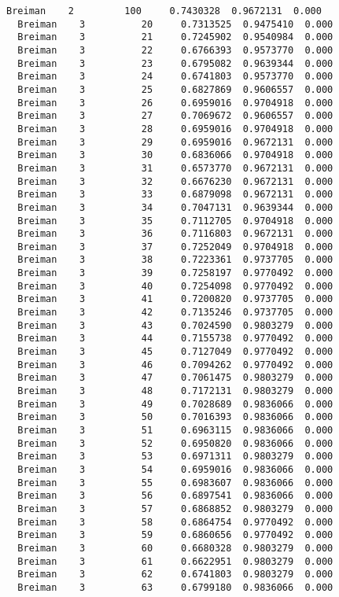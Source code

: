 \documentclass[11pt]{article}
\begin{document}
\begin{Verbatim}[commandchars=\\\{\}]
  Breiman    2         100     0.7430328  0.9672131  0.000
  Breiman    3          20     0.7313525  0.9475410  0.000
  Breiman    3          21     0.7245902  0.9540984  0.000
  Breiman    3          22     0.6766393  0.9573770  0.000
  Breiman    3          23     0.6795082  0.9639344  0.000
  Breiman    3          24     0.6741803  0.9573770  0.000
  Breiman    3          25     0.6827869  0.9606557  0.000
  Breiman    3          26     0.6959016  0.9704918  0.000
  Breiman    3          27     0.7069672  0.9606557  0.000
  Breiman    3          28     0.6959016  0.9704918  0.000
  Breiman    3          29     0.6959016  0.9672131  0.000
  Breiman    3          30     0.6836066  0.9704918  0.000
  Breiman    3          31     0.6573770  0.9672131  0.000
  Breiman    3          32     0.6676230  0.9672131  0.000
  Breiman    3          33     0.6879098  0.9672131  0.000
  Breiman    3          34     0.7047131  0.9639344  0.000
  Breiman    3          35     0.7112705  0.9704918  0.000
  Breiman    3          36     0.7116803  0.9672131  0.000
  Breiman    3          37     0.7252049  0.9704918  0.000
  Breiman    3          38     0.7223361  0.9737705  0.000
  Breiman    3          39     0.7258197  0.9770492  0.000
  Breiman    3          40     0.7254098  0.9770492  0.000
  Breiman    3          41     0.7200820  0.9737705  0.000
  Breiman    3          42     0.7135246  0.9737705  0.000
  Breiman    3          43     0.7024590  0.9803279  0.000
  Breiman    3          44     0.7155738  0.9770492  0.000
  Breiman    3          45     0.7127049  0.9770492  0.000
  Breiman    3          46     0.7094262  0.9770492  0.000
  Breiman    3          47     0.7061475  0.9803279  0.000
  Breiman    3          48     0.7172131  0.9803279  0.000
  Breiman    3          49     0.7028689  0.9836066  0.000
  Breiman    3          50     0.7016393  0.9836066  0.000
  Breiman    3          51     0.6963115  0.9836066  0.000
  Breiman    3          52     0.6950820  0.9836066  0.000
  Breiman    3          53     0.6971311  0.9803279  0.000
  Breiman    3          54     0.6959016  0.9836066  0.000
  Breiman    3          55     0.6983607  0.9836066  0.000
  Breiman    3          56     0.6897541  0.9836066  0.000
  Breiman    3          57     0.6868852  0.9803279  0.000
  Breiman    3          58     0.6864754  0.9770492  0.000
  Breiman    3          59     0.6860656  0.9770492  0.000
  Breiman    3          60     0.6680328  0.9803279  0.000
  Breiman    3          61     0.6622951  0.9803279  0.000
  Breiman    3          62     0.6741803  0.9803279  0.000
  Breiman    3          63     0.6799180  0.9836066  0.000

\end{Verbatim}
\end{document}
